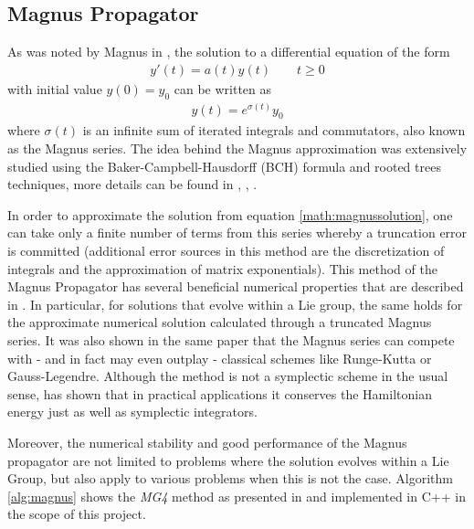 \subsection{Magnus Propagator}
\label{sub:magnus_propagator}
%
As was noted by Magnus in \cite{Magnus1954}, the solution to a differential equation of the form 
%
\begin{align}
	y'(t) = a(t) y(t) \qquad t \ge 0
\end{align}
%
with initial value $y(0) = y_0$ can be written as
%
\begin{align}
	\label{math:magnussolution}
	y(t) = e^{\sigma (t)} y_0
\end{align}
%
where $\sigma (t)$ is an infinite sum of iterated integrals and commutators, also known as the Magnus series.
The idea behind the Magnus approximation was extensively studied using the Baker-Campbell-Hausdorff (BCH) formula and rooted trees techniques, more details can be found in \cite{Blanes2006}, \cite{Blanes2000}, \cite{Iserles1999}.
\par\medskip
%
In order to approximate the solution from equation \ref{math:magnussolution}, one can take only a finite number of terms from this series whereby a truncation error is committed
(additional error sources in this method are the discretization of integrals and the approximation of matrix exponentials).
%
This method of the Magnus Propagator has several beneficial numerical properties that are described in \cite{Iserles1999}.
In particular, for solutions that evolve within a Lie group, the same holds for the approximate numerical solution calculated through a truncated Magnus series. 
It was also shown in the same paper that the Magnus series can compete with - and in fact may even outplay - classical schemes like Runge-Kutta or Gauss-Legendre.
Although the method is not a symplectic scheme in the usual sense, \cite{Iserles1999} has shown that in practical applications it conserves the Hamiltonian energy just as well as symplectic integrators.
\par\medskip
Moreover, the numerical stability and good performance of the Magnus propagator are not limited to problems where the solution evolves within a Lie Group, but also apply to various problems when this is not the case.
Algorithm \ref{alg:magnus} shows the \emph{MG4} method as presented in \cite{Iserles1999} and implemented in C++ in the scope of this project.

